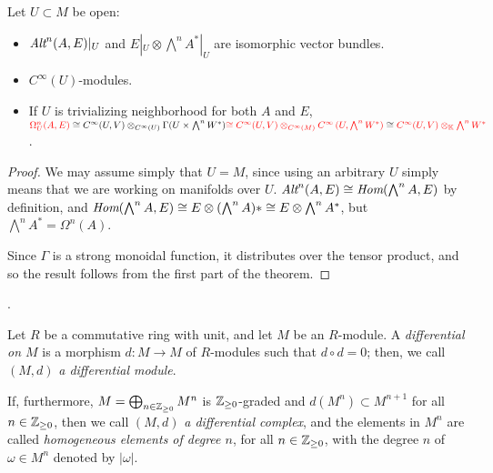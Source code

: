 \lin

\begin{theorem}\label{isomorphOmega}
Let $U\subset M$ be open:
    \begin{itemize}
    
    \item $\operatorname{\textit{Alt}}^n(A, E)|_U$ and $E|_U \otimes \bigwedge^n A^*|_U$ are isomorphic vector bundles.
    
    
    \item {} $C^\infty(U)$-modules.
    
    \item If $U$ is trivializing neighborhood for both $A$ and $E$, $\textcolor{red}{\Omega_U^n(A, E)} \cong C^\infty(U, V) \otimes_{C^\infty(U)} \Gamma(U \times \bigwedge^n W^*) \textcolor{red}{\cong C^\infty(U, V) \otimes_{C^\infty(M)} C^\infty\left(U, \bigwedge^n W^* \right) } \cong \textcolor{red}{ C^\infty(U, V) \otimes_{\mathbb{K}} \bigwedge^n W^*}$.
    
    
    \end{itemize}
\end{theorem}

\begin{proof}
We may assume simply that $U = M$, since using an arbitrary $U$ simply means that we are working on manifolds over $U$. $\operatorname{\textit{Alt}}^n(A, E) \cong \operatorname{\textit{Hom}}(\bigwedge^n A, E)$ by definition, and $\operatorname{\textit{Hom}}(\bigwedge^n A, E) \cong E \otimes (\bigwedge^n A)* \cong E \otimes \bigwedge^n A^*$, but $\bigwedge^n A^* = \Omega^n(A)$.

Since $\Gamma$ is a strong monoidal function, it distributes over the tensor product, and so the result follows from the first part of the theorem.
\end{proof}

\linea


.

\begin{definition}
    Let $R$ be a commutative ring with unit, and let $M$ be an $R$-module. 
    A \emph{differential on $M$} is a morphism $d: M \to M$ of $R$-modules such that $d\circ d = 0$; then, we call $(M, d)$ \emph{a differential module}. 
    
    If, furthermore, $
    M = \bigoplus_{n \in \mathbb{Z}_{\geq 0}}M^n$ is $\mathbb{Z}_{\geq 0}$-graded and $d(M^n) \subset M^{n+1}$ for all $n \in \mathbb{Z}_{\geq 0}$, then we call $(M, d)$ \emph{a differential complex}, and the elements in $M^n$ are called \emph{homogeneous elements of degree $n$}, for all $n \in \mathbb{Z}_{\geq 0}$, with the degree $n$ of $\omega \in M^n$ denoted by $|\omega|$.
\end{definition}

